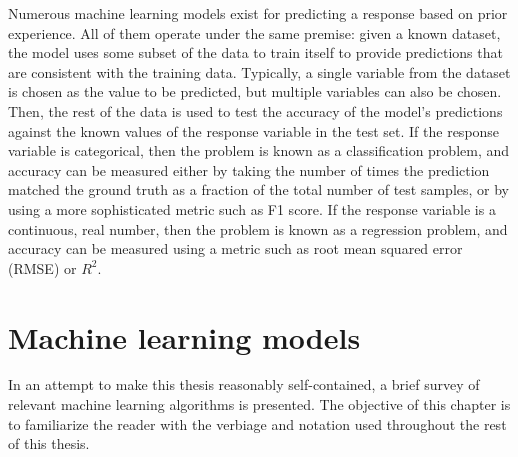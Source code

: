 Numerous machine learning models exist for predicting a response based on prior experience.  All of them operate under the same premise: given a known dataset, the model uses some subset of the data to train itself to provide predictions that are consistent with the training data.  Typically, a single variable from the dataset is chosen as the value to be predicted, but multiple variables can also be chosen.  Then, the rest of the data is used to test the accuracy of the model's predictions against the known values of the response variable in the test set.  If the response variable is categorical, then the problem is known as a classification problem, and accuracy can be measured either by taking the number of times the prediction matched the ground truth as a fraction of the total number of test samples, or by using a more sophisticated metric such as F1 score.  If the response variable is a continuous, real number, then the problem is known as a regression problem, and accuracy can be measured using a metric such as root mean squared error (RMSE) or $R^2$.

\section{Machine learning models}

In an attempt to make this thesis reasonably self-contained, a brief survey of relevant machine learning algorithms is presented.  The objective of this chapter is to familiarize the reader with the verbiage and notation used throughout the rest of this thesis.

